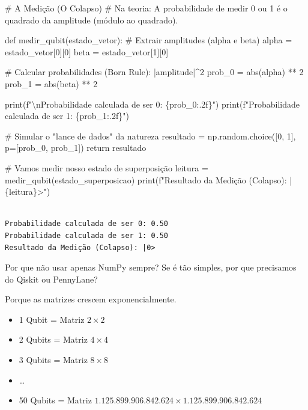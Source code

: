 \documentclass[
  brazilian,
]{report}
\newenvironment{Shaded}{\begin{snugshade}}{\end{snugshade}}
\newcommand{\NormalTok}[1]{\textcolor[rgb]{0.00,0.23,0.31}{#1}}
\providecommand{\tightlist}{%
  \setlength{\itemsep}{0pt}\setlength{\parskip}{0pt}}
\begin{document}
\begin{Shaded}
\begin{Highlighting}[]


\NormalTok{\# A Medição (O Colapso)}
\NormalTok{\# Na teoria: A probabilidade de medir 0 ou 1 é o quadrado da amplitude (módulo ao quadrado).}

\NormalTok{def medir\_qubit(estado\_vetor):}
\NormalTok{    \# Extrair amplitudes (alpha e beta)}
\NormalTok{    alpha = estado\_vetor[0][0]}
\NormalTok{    beta = estado\_vetor[1][0]}
    
\NormalTok{    \# Calcular probabilidades (Born Rule): |amplitude|\^{}2}
\NormalTok{    prob\_0 = abs(alpha) ** 2}
\NormalTok{    prob\_1 = abs(beta) ** 2}
    
\NormalTok{    print(f"\textbackslash{}nProbabilidade calculada de ser 0: \{prob\_0:.2f\}")}
\NormalTok{    print(f"Probabilidade calculada de ser 1: \{prob\_1:.2f\}")}
    
\NormalTok{    \# Simular o "lance de dados" da natureza}
\NormalTok{    resultado = np.random.choice([0, 1], p=[prob\_0, prob\_1])}
\NormalTok{    return resultado}

\NormalTok{\# Vamos medir nosso estado de superposição}
\NormalTok{leitura = medir\_qubit(estado\_superposicao)}
\NormalTok{print(f"Resultado da Medição (Colapso): |\{leitura\}\textgreater{}")}
\end{Highlighting}
\end{Shaded}

\begin{verbatim}

Probabilidade calculada de ser 0: 0.50
Probabilidade calculada de ser 1: 0.50
Resultado da Medição (Colapso): |0>
\end{verbatim}

Por que não usar apenas NumPy sempre? Se é tão simples, por que
precisamos do Qiskit ou PennyLane?

Porque as matrizes crescem exponencialmente.

\begin{itemize}
\tightlist
\item
  1 Qubit = Matriz \(2 \times 2\)
\item
  2 Qubits = Matriz \(4 \times 4\)
\item
  3 Qubits = Matriz \(8 \times 8\)
\item
  \ldots{}
\item
  50 Qubits = Matriz
  \(1.125.899.906.842.624 \times 1.125.899.906.842.624\)
\end{itemize}
\end{document}
